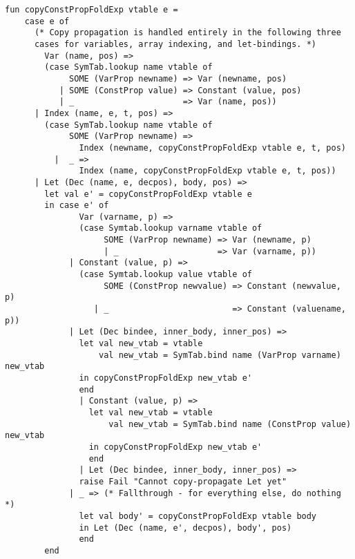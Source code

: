 \documentclass[a4paper]{article}
\begin{document}
\begin{lstlisting}
fun copyConstPropFoldExp vtable e =
    case e of
      (* Copy propagation is handled entirely in the following three
      cases for variables, array indexing, and let-bindings. *)
        Var (name, pos) =>
        (case SymTab.lookup name vtable of
             SOME (VarProp newname) => Var (newname, pos)
           | SOME (ConstProp value) => Constant (value, pos)
           | _                      => Var (name, pos))
      | Index (name, e, t, pos) =>
        (case SymTab.lookup name vtable of
             SOME (VarProp newname) =>
               Index (newname, copyConstPropFoldExp vtable e, t, pos)
          |  _ =>
               Index (name, copyConstPropFoldExp vtable e, t, pos))
      | Let (Dec (name, e, decpos), body, pos) =>
        let val e' = copyConstPropFoldExp vtable e
        in case e' of
               Var (varname, p) =>
               (case Symtab.lookup varname vtable of
                    SOME (VarProp newname) => Var (newname, p)
                    | _                    => Var (varname, p))
             | Constant (value, p) =>
               (case Symtab.lookup value vtable of
                    SOME (ConstProp newvalue) => Constant (newvalue, p)
                  | _                         => Constant (valuename, p))
             | Let (Dec bindee, inner_body, inner_pos) =>
               let val new_vtab = vtable
                   val new_vtab = SymTab.bind name (VarProp varname) new_vtab
               in copyConstPropFoldExp new_vtab e'
               end
               | Constant (value, p) =>
                 let val new_vtab = vtable
                     val new_vtab = SymTab.bind name (ConstProp value) new_vtab
                 in copyConstPropFoldExp new_vtab e'
                 end
               | Let (Dec bindee, inner_body, inner_pos) =>
               raise Fail "Cannot copy-propagate Let yet"
             | _ => (* Fallthrough - for everything else, do nothing *)
               let val body' = copyConstPropFoldExp vtable body
               in Let (Dec (name, e', decpos), body', pos)
               end
        end
\end{lstlisting}
\end{document}
